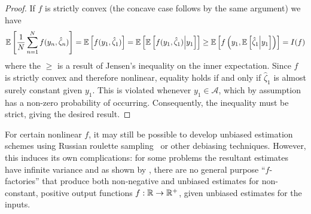 \begin{proof}
	If $f$ is strictly convex (the concave case follows by the same argument) we have
	\begin{align*}
	\mathbb{E}\left[\frac{1}{N} \sum_{n=1}^N f(y_n, \hat{\zeta}_n)\right] = \mathbb{E}\left[f(y_1, \hat{\zeta}_1)\right] 
	= \mathbb{E}\left[\mathbb{E}\left[f(y_1, \hat{\zeta}_1) \middle| y_1\right]\right] 
	\ge \mathbb{E}\left[f\left(y_1, \mathbb{E}\left[\hat{\zeta}_1 \middle| y_1\right]\right)\right] = I(f)
	\end{align*}
	where the $\ge$ is a result of Jensen's inequality on the inner expectation.  
	Since $f$ is strictly convex and therefore nonlinear, equality holds if and only if
	$\hat{\zeta}_1$ is almost surely constant given $y_1$. 
	This is violated whenever $y_1 \in \mathcal{A}$, which by assumption
	has a non-zero probability of occurring.  Consequently,
	the inequality must be strict, giving the desired result.
\end{proof}
For certain nonlinear $f$, it may still be possible to develop unbiased estimation
schemes using Russian roulette sampling~\citep{lyne2015russian} or other debiasing techniques.  
However, this induces its own complications: for some problems the resultant estimates
have infinite variance \citep{lyne2015russian} and as shown by \cite{jacob2015nonnegative}, there are 
no general purpose ``$f$-factories'' that produce both non-negative and
unbiased estimates for non-constant, positive output functions $f : \mathbb{R} \rightarrow \mathbb{R}^+$,
given unbiased estimates for the inputs.

